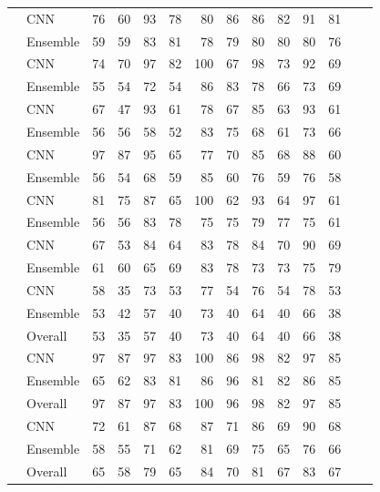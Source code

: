 \begin{tabular}{ll rr rr rr rr rr rr}
\rowcolor{gray!10} \multirow[t]{2}{*}{U05} & CNN & 76 & 60 & 93 & 78 & 80 & 86 & 86 & 82 & 91 & 81 \\
\rowcolor{gray!10}  & Ensemble & 59 & 59 & 83 & 81 & 78 & 79 & 80 & 80 & 80 & 76 \\
\rowcolor{white}   \multirow[t]{2}{*}{U07} & CNN & 74 & 70 & 97 & 82 & 100 & 67 & 98 & 73 & 92 & 69 \\
\rowcolor{white}    & Ensemble & 55 & 54 & 72 & 54 & 86 & 83 & 78 & 66 & 73 & 69 \\
\rowcolor{gray!10} \multirow[t]{2}{*}{U12} & CNN & 67 & 47 & 93 & 61 & 78 & 67 & 85 & 63 & 93 & 61 \\
\rowcolor{gray!10}  & Ensemble & 56 & 56 & 58 & 52 & 83 & 75 & 68 & 61 & 73 & 66 \\
\rowcolor{white}   \multirow[t]{2}{*}{U15} & CNN & 97 & 87 & 95 & 65 & 77 & 70 & 85 & 68 & 88 & 60 \\
\rowcolor{white}    & Ensemble & 56 & 54 & 68 & 59 & 85 & 60 & 76 & 59 & 76 & 58 \\
\rowcolor{gray!10} \multirow[t]{2}{*}{U16} & CNN & 81 & 75 & 87 & 65 & 100 & 62 & 93 & 64 & 97 & 61 \\
\rowcolor{gray!10}  & Ensemble & 56 & 56 & 83 & 78 & 75 & 75 & 79 & 77 & 75 & 61 \\
\rowcolor{white}   \multirow[t]{2}{*}{U17} & CNN & 67 & 53 & 84 & 64 & 83 & 78 & 84 & 70 & 90 & 69 \\
\rowcolor{white}    & Ensemble & 61 & 60 & 65 & 69 & 83 & 78 & 73 & 73 & 75 & 79 \\
\midrule
\rowcolor{gray!10} \multirow[t]{3}{*}{Min} & CNN & 58 & 35 & 73 & 53 & 77 & 54 & 76 & 54 & 78 & 53 \\
\rowcolor{gray!10}  & Ensemble & 53 & 42 & 57 & 40 & 73 & 40 & 64 & 40 & 66 & 38 \\
\rowcolor{gray!10}  & Overall & 53 & 35 & 57 & 40 & 73 & 40 & 64 & 40 & 66 & 38 \\
\rowcolor{white}   \multirow[t]{3}{*}{Max} & CNN & 97 & 87 & 97 & 83 & 100 & 86 & 98 & 82 & 97 & 85 \\
\rowcolor{white}    & Ensemble & 65 & 62 & 83 & 81 & 86 & 96 & 81 & 82 & 86 & 85 \\
\rowcolor{white}    & Overall & 97 & 87 & 97 & 83 & 100 & 96 & 98 & 82 & 97 & 85 \\
\rowcolor{gray!10} \multirow[t]{3}{*}{Mean} & CNN & 72 & 61 & 87 & 68 & 87 & 71 & 86 & 69 & 90 & 68 \\
\rowcolor{gray!10}  & Ensemble & 58 & 55 & 71 & 62 & 81 & 69 & 75 & 65 & 76 & 66 \\
\rowcolor{gray!10}  & Overall & 65 & 58 & 79 & 65 & 84 & 70 & 81 & 67 & 83 & 67 \\
\bottomrule
\end{tabular}


